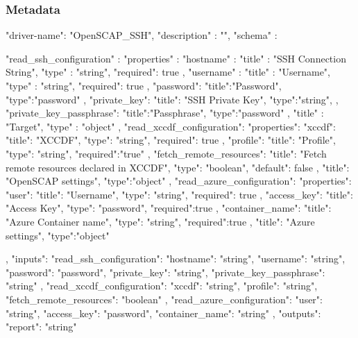 \documentclass[../main.tex]{subfiles}
\begin{document}
\subsubsection{Metadata}

\begin{js}
{
  "driver-name": "OpenSCAP_SSH",
  "description" : "",
  "schema" : {
        "read_ssh_configuration" : {
            "properties" : {
                "hostname" : {
                    "title" : "SSH Connection String",
                    "type" : "string",
                    "required": true
                },
                "username" : {
                    "title" : "Username",
                    "type" : "string",
                    "required": true
                },
                "password": {
                    "title":"Password",
                    "type":"password"
                },
                "private_key": {
                    "title": "SSH Private Key",
                    "type":"string",
                },
                "private_key_passphrase": {
                    "title":"Passphrase",
                    "type":"password"
                }
            },
            "title" : "Target",
            "type" : "object"
        },
        "read_xccdf_configuration":{
            "properties": {
                "xccdf": {
                    "title": "XCCDF",
                    "type": "string",
                    "required": true
                },
                "profile": {
                    "title": "Profile",
                    "type": "string",
                    "required":"true"
                },
                "fetch_remote_resources": {
                    "title": "Fetch remote resources declared in XCCDF",
                    "type": "boolean",
                    "default": false
                }
            },
            "title": "OpenSCAP settings",
            "type":"object"
        },
        "read_azure_configuration":{
            "properties": {
                "user": {
                    "title": "Username",
                    "type": "string",
                    "required": true
                },
                "access_key": {
                    "title": "Access Key",
                    "type": "password",
                    "required":true
                },
                "container_name": {
                    "title": "Azure Container name",
                    "type": "string",
                    "required":true
                }
            },
            "title": "Azure settings",
            "type":"object"
        }

    },
    "inputs": {
        "read_ssh_configuration": {
            "hostname": "string",
            "username": "string",
            "password": "password",
            "private_key": "string",
            "private_key_passphrase": "string"
        },
        "read_xccdf_configuration": {
            "xccdf": "string",
            "profile": "string",
            "fetch_remote_resources": "boolean"
        },
        "read_azure_configuration": {
            "user": "string",
            "access_key": "password",
            "container_name": "string"
        }
    },
    "outputs": {
        "report": "string"
    }
}
\end{js}
\end{document}
